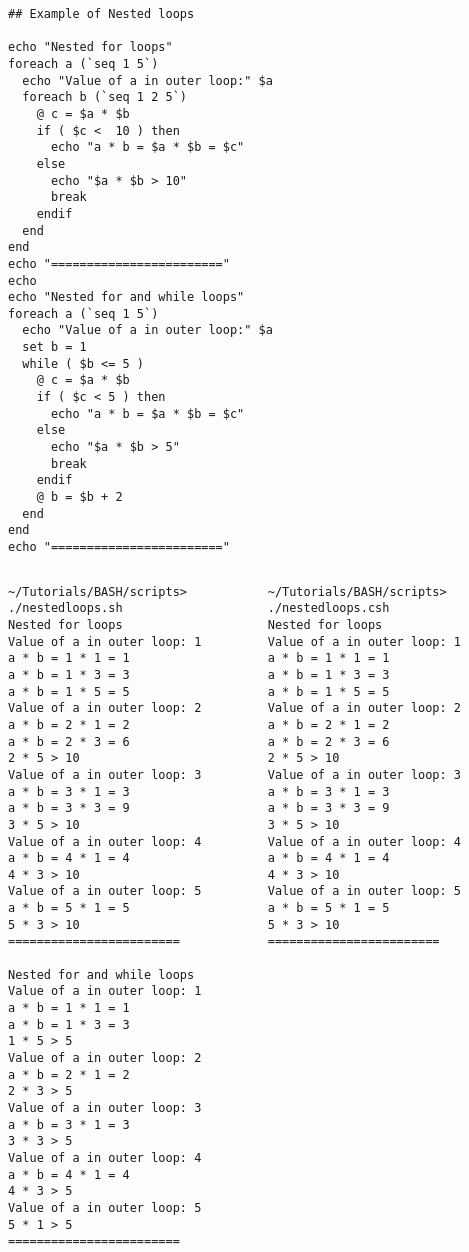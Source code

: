 \documentclass[slidestop,mathserif,compress,xcolor=svgnames]{beamer}
\newenvironment{bblock}[0]
{
\begin{beamerboxesrounded}[upper=uppercol1,lower=lowercol1,shadow=true]}
{\end{beamerboxesrounded}}
\newenvironment{eblock}[0]
{
\begin{beamerboxesrounded}[upper=uppercol2,lower=lowercol2,shadow=true]}
{\end{beamerboxesrounded}}
\begin{document}
\begin{frame}
{\begin{columns}
\begin{bblock}{}
\begin{verbatim}
## Example of Nested loops

echo "Nested for loops"
foreach a (`seq 1 5`)
  echo "Value of a in outer loop:" $a
  foreach b (`seq 1 2 5`)
    @ c = $a * $b
    if ( $c <  10 ) then
      echo "a * b = $a * $b = $c"
    else
      echo "$a * $b > 10"
      break
    endif
  end
end
echo "========================"
echo
echo "Nested for and while loops"
foreach a (`seq 1 5`)
  echo "Value of a in outer loop:" $a
  set b = 1
  while ( $b <= 5 )
    @ c = $a * $b
    if ( $c < 5 ) then
      echo "a * b = $a * $b = $c"
    else
      echo "$a * $b > 5"
      break
    endif
    @ b = $b + 2
  end
end
echo "========================"
          \end{verbatim}
      \end{bblock}
    \end{columns}
    \framebreak
    \begin{columns}
      \vspace{-0.2cm}
      \begin{eblock}{}
        \begin{verbatim}
~/Tutorials/BASH/scripts> ./nestedloops.sh 
Nested for loops
Value of a in outer loop: 1
a * b = 1 * 1 = 1
a * b = 1 * 3 = 3
a * b = 1 * 5 = 5
Value of a in outer loop: 2
a * b = 2 * 1 = 2
a * b = 2 * 3 = 6
2 * 5 > 10
Value of a in outer loop: 3
a * b = 3 * 1 = 3
a * b = 3 * 3 = 9
3 * 5 > 10
Value of a in outer loop: 4
a * b = 4 * 1 = 4
4 * 3 > 10
Value of a in outer loop: 5
a * b = 5 * 1 = 5
5 * 3 > 10
========================

Nested for and while loops
Value of a in outer loop: 1
a * b = 1 * 1 = 1
a * b = 1 * 3 = 3
1 * 5 > 5
Value of a in outer loop: 2
a * b = 2 * 1 = 2
2 * 3 > 5
Value of a in outer loop: 3
a * b = 3 * 1 = 3
3 * 3 > 5
Value of a in outer loop: 4
a * b = 4 * 1 = 4
4 * 3 > 5
Value of a in outer loop: 5
5 * 1 > 5
========================
        \end{verbatim}
      \end{eblock}
      \vspace{-0.2cm}
      \begin{bblock}{}
        \begin{verbatim}
~/Tutorials/BASH/scripts> ./nestedloops.csh 
Nested for loops
Value of a in outer loop: 1
a * b = 1 * 1 = 1
a * b = 1 * 3 = 3
a * b = 1 * 5 = 5
Value of a in outer loop: 2
a * b = 2 * 1 = 2
a * b = 2 * 3 = 6
2 * 5 > 10
Value of a in outer loop: 3
a * b = 3 * 1 = 3
a * b = 3 * 3 = 9
3 * 5 > 10
Value of a in outer loop: 4
a * b = 4 * 1 = 4
4 * 3 > 10
Value of a in outer loop: 5
a * b = 5 * 1 = 5
5 * 3 > 10
========================


\end{verbatim}
\end{bblock}
\end{columns}}
\end{frame}
\end{document}
